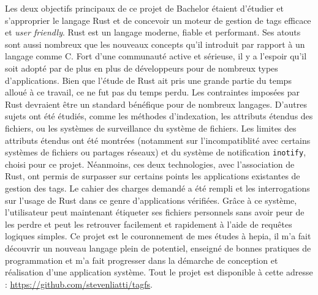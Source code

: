 Les deux objectifs principaux de ce projet de Bachelor étaient d'étudier et s'approprier le 
langage Rust et de concevoir un moteur de gestion de tags efficace et \textit{user friendly}.
Rust est un langage moderne, fiable et performant. Ses atouts sont aussi nombreux que les nouveaux 
concepts qu'il introduit par rapport à un langage comme C. Fort d'une communauté active et sérieuse, 
il y a l'espoir qu'il soit adopté par de plus en plus de développeurs pour de nombreux types d'applications.
Bien que l'étude de Rust ait pris une grande partie du temps alloué à ce travail, ce ne fut pas du 
temps perdu. Les contraintes imposées par Rust devraient être un standard bénéfique pour de nombreux 
langages. 
\bigbreak
D'autres sujets ont été étudiés, comme les méthodes d'indexation, les attributs étendus des fichiers, 
ou les systèmes de surveillance du système de fichiers. Les limites des attributs étendus ont été 
montrées (notamment sur l'incompatiblité avec certains systèmes de fichiers ou partages réseaux) 
et du système de notification \texttt{inotify}, choisi pour ce projet. Néanmoins, ces 
deux technologies, avec l'association de Rust, ont permis de surpasser sur certains points les 
applications existantes de gestion des tags. Le cahier des charges demandé 
a été rempli et les interrogations sur l'usage de Rust dans ce genre d'applications vérifiées. 
Grâce à ce système, l'utilisateur peut maintenant étiqueter ses fichiers personnels sans avoir 
peur de les perdre et peut les retrouver facilement et rapidement à l'aide de requêtes logiques 
simples. 
\bigbreak
Ce projet est le couronnement de mes études à hepia, il m'a fait découvrir un nouveau langage 
plein de potentiel, enseigné de bonnes pratiques de programmation et m'a fait progresser dans 
la démarche de conception et réalisation d'une application système. Tout le projet est disponible 
à cette adresse : \url{https://github.com/stevenliatti/tagfs}.
